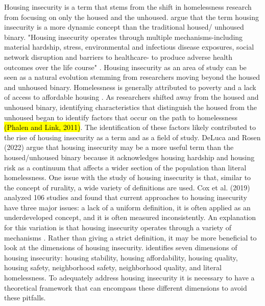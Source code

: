 Housing insecurity is a term that stems from the shift in homelessness research from focusing on only the housed and the unhoused. %
 \citep{deluca_housing_2022} argue that the term housing insecurity is a more dynamic concept than the traditional housed/ unhoused binary. "Housing insecurity operates through multiple mechanisms-including material hardship, stress, environmental and infectious disease exposures, social network disruption and barriers to healthcare- to produce adverse health outcomes over the life course" \citep{leifheit_building_2022}. Housing insecurity as an area of study can be seen as a natural evolution stemming from researchers moving beyond the housed and unhoused binary. Homelessness is generally attributed to poverty and a lack of access to affordable housing \citep{noauthor_rural_2009}.  As researchers shifted away from the housed and unhoused binary, identifying characteristics that distinguish the housed from the unhoused began to identify factors that occur on the path to homelessness \hl{(Phalen and Link, 2011)}.  The identification of these factors likely contributed to the rise of housing insecurity as a term and as a field of study.  DeLuca and Rosen (2022) argue that housing insecurity may be a more useful term than the housed/unhoused binary because it acknowledges housing hardship and housing risk as a continuum that affects a wider section of the population than literal homelessness.  One issue with the study of housing insecurity is that, similar to the concept of rurality, a wide variety of definitions are used. Cox et al. (2019) analyzed 106 studies and found that current approaches to housing insecurity have three major issues: a lack of a uniform definition, it is often applied as an underdeveloped concept, and it is often measured inconsistently. An explanation for this variation is that housing insecurity operates through a variety of mechanisms \citep{leifheit_building_2022}.  Rather than giving a strict definition, it may be more beneficial to look at the dimensions of housing insecurity. \citet{cox_road_2019} identifies seven dimensions of housing insecurity: housing stability, housing affordability, housing quality, housing safety, neighborhood safety, neighborhood quality, and literal homelessness. To adequately address housing insecurity it is necessary to have a theoretical framework that can encompass these different dimensions to avoid these pitfalls. 

